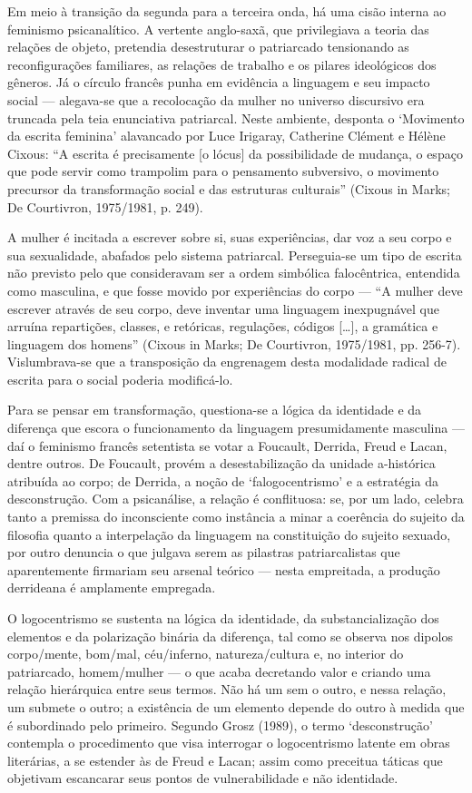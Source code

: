 Em meio à transição da segunda para a terceira onda, há uma cisão
interna ao feminismo psicanalítico. A vertente anglo-saxã, que
privilegiava a teoria das relações de objeto, pretendia desestruturar o
patriarcado tensionando as reconfigurações familiares, as relações de
trabalho e os pilares ideológicos dos gêneros. Já o círculo francês
punha em evidência a linguagem e seu impacto social --- alegava-se que a
recolocação da mulher no universo discursivo era truncada pela teia
enunciativa patriarcal. Neste ambiente, desponta o `Movimento da escrita
feminina' alavancado por Luce Irigaray, Catherine Clément e Hélène
Cixous: ``A escrita é precisamente {[}o lócus{]} da possibilidade de
mudança, o espaço que pode servir como trampolim para o pensamento
subversivo, o movimento precursor da transformação social e das
estruturas culturais'' (Cixous in Marks; De Courtivron, 1975/1981, p.
249).

A mulher é incitada a escrever sobre si, suas experiências, dar voz a
seu corpo e sua sexualidade, abafados pelo sistema patriarcal.
Perseguia-se um tipo de escrita não previsto pelo que consideravam ser a
ordem simbólica falocêntrica, entendida como masculina, e que fosse
movido por experiências do corpo --- ``A mulher deve escrever através de
seu corpo, deve inventar uma linguagem inexpugnável que arruína
repartições, classes, e retóricas, regulações, códigos {[}\ldots{}{]}, a
gramática e linguagem dos homens'' (Cixous in Marks; De Courtivron,
1975/1981, pp. 256-7). Vislumbrava-se que a transposição da engrenagem
desta modalidade radical de escrita para o social poderia modificá-lo.

Para se pensar em transformação, questiona-se a lógica da identidade e
da diferença que escora o funcionamento da linguagem presumidamente
masculina --- daí o feminismo francês setentista se votar a Foucault,
Derrida, Freud e Lacan, dentre outros. De Foucault, provém a
desestabilização da unidade a-histórica atribuída ao corpo; de Derrida,
a noção de `falogocentrismo' e a estratégia da desconstrução. Com a
psicanálise, a relação é conflituosa: se, por um lado, celebra tanto a
premissa do inconsciente como instância a minar a coerência do sujeito
da filosofia quanto a interpelação da linguagem na constituição do
sujeito sexuado, por outro denuncia o que julgava serem as pilastras
patriarcalistas que aparentemente firmariam seu arsenal teórico --- nesta
empreitada, a produção derrideana é amplamente empregada.

O logocentrismo se sustenta na lógica da identidade, da
substancialização dos elementos e da polarização binária da diferença,
tal como se observa nos dipolos corpo/mente, bom/mal, céu/inferno,
natureza/cultura e, no interior do patriarcado, homem/mulher --- o que
acaba decretando valor e criando uma relação hierárquica entre seus
termos. Não há um sem o outro, e nessa relação, um submete o outro; a
existência de um elemento depende do outro à medida que é subordinado
pelo primeiro. Segundo Grosz (1989), o termo `desconstrução' contempla o
procedimento que visa interrogar o logocentrismo latente em obras
literárias, a se estender às de Freud e Lacan; assim como preceitua
táticas que objetivam escancarar seus pontos de vulnerabilidade e não
identidade.

